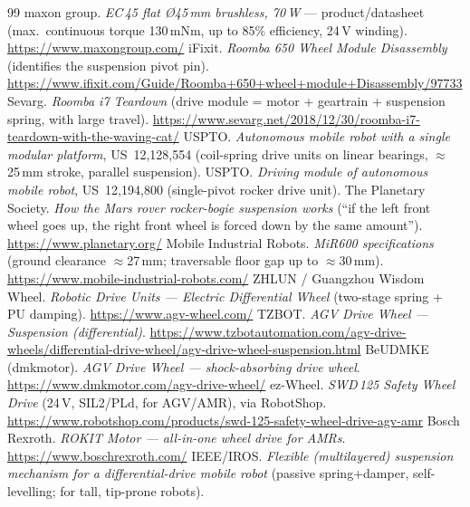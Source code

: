 \documentclass[11pt,a4paper]{article}
\begin{document}
\begin{thebibliography}{99}
\small
{} maxon group. \textit{EC\,45 flat \O45\,mm brushless, 70\,W} — product/datasheet
(max.\ continuous torque 130\,mNm, up to 85\% efficiency, 24\,V winding).
\url{https://www.maxongroup.com/}
 iFixit. \textit{Roomba 650 Wheel Module Disassembly} (identifies the suspension pivot
pin). \url{https://www.ifixit.com/Guide/Roomba+650+wheel+module+Disassembly/97733}
 Sevarg. \textit{Roomba i7 Teardown} (drive module = motor + geartrain + suspension
spring, with large travel). \url{https://www.sevarg.net/2018/12/30/roomba-i7-teardown-with-the-waving-cat/}
 USPTO. \textit{Autonomous mobile robot with a single modular platform},
US~12,128,554 (coil-spring drive units on linear bearings, $\approx$25\,mm stroke, parallel suspension).
 USPTO. \textit{Driving module of autonomous mobile robot}, US~12,194,800
(single-pivot rocker drive unit). 
 The Planetary Society. \textit{How the Mars rover rocker-bogie suspension works}
(``if the left front wheel goes up, the right front wheel is forced down by the same amount'').
\url{https://www.planetary.org/}
 Mobile Industrial Robots. \textit{MiR600 specifications} (ground clearance $\approx$27\,mm;
traversable floor gap up to $\approx$30\,mm). \url{https://www.mobile-industrial-robots.com/}
 ZHLUN / Guangzhou Wisdom Wheel. \textit{Robotic Drive Units — Electric Differential
Wheel} (two-stage spring + PU damping). \url{https://www.agv-wheel.com/}
 TZBOT. \textit{AGV Drive Wheel — Suspension (differential)}.
\url{https://www.tzbotautomation.com/agv-drive-wheels/differential-drive-wheel/agv-drive-wheel-suspension.html}
 BeUDMKE (dmkmotor). \textit{AGV Drive Wheel — shock-absorbing drive wheel}.
\url{https://www.dmkmotor.com/agv-drive-wheel/}
 ez-Wheel. \textit{SWD\,125 Safety Wheel Drive} (24\,V, SIL2/PLd, for AGV/AMR), via
RobotShop. \url{https://www.robotshop.com/products/swd-125-safety-wheel-drive-agv-amr}
 Bosch Rexroth. \textit{ROKIT Motor — all-in-one wheel drive for AMRs}.
\url{https://www.boschrexroth.com/}
 IEEE/IROS. \textit{Flexible (multilayered) suspension mechanism for a differential-drive
mobile robot} (passive spring+damper, self-levelling; for tall, tip-prone robots).
\end{thebibliography}
\end{document}
